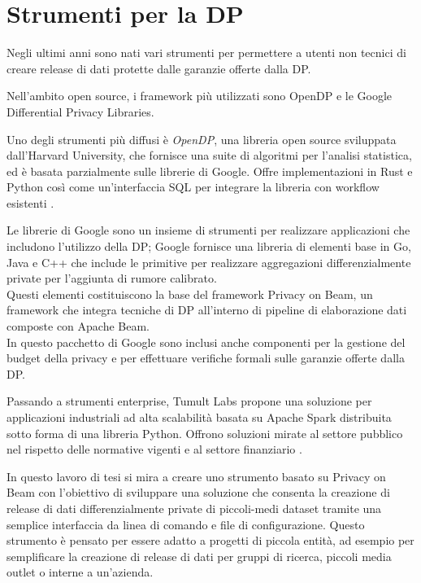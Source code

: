 \section{Strumenti per la DP}
Negli ultimi anni sono nati vari strumenti per permettere a utenti non tecnici di creare release di dati protette dalle garanzie offerte dalla DP.

Nell'ambito open source, i framework più utilizzati sono OpenDP e le Google Differential Privacy Libraries.

Uno degli strumenti più diffusi è \textit{OpenDP}, una libreria open source sviluppata dall'Harvard University, che fornisce una suite di algoritmi per l'analisi statistica, ed è basata parzialmente sulle librerie di Google. Offre implementazioni in Rust e Python così come un'interfaccia SQL per integrare la libreria con workflow esistenti \cite{opendp}.

Le librerie di Google sono un insieme di strumenti per realizzare applicazioni che includono l'utilizzo della DP; Google fornisce una libreria di elementi base in Go, Java e C++ che include le primitive per realizzare aggregazioni differenzialmente private per l'aggiunta di rumore calibrato.\\
Questi elementi costituiscono la base del framework Privacy on Beam, un framework che integra tecniche di DP all'interno di pipeline di elaborazione dati composte con Apache Beam.\\
In questo pacchetto di Google sono inclusi anche componenti per la gestione del budget della privacy e per effettuare verifiche formali sulle garanzie offerte dalla DP.

Passando a strumenti enterprise, Tumult Labs propone una soluzione per applicazioni industriali ad alta scalabilità basata su Apache Spark distribuita sotto forma di una libreria Python. Offrono soluzioni mirate al settore pubblico nel rispetto delle normative vigenti e al settore finanziario \cite{tumultanalytics}.

In questo lavoro di tesi si mira a creare uno strumento basato su Privacy on Beam con l'obiettivo di sviluppare una soluzione che consenta la creazione di release di dati differenzialmente private di piccoli-medi dataset tramite una semplice interfaccia da linea di comando e file di configurazione. Questo strumento è pensato per essere adatto a progetti di piccola entità, ad esempio per semplificare la creazione di release di dati per gruppi di ricerca, piccoli media outlet o interne a un'azienda.







